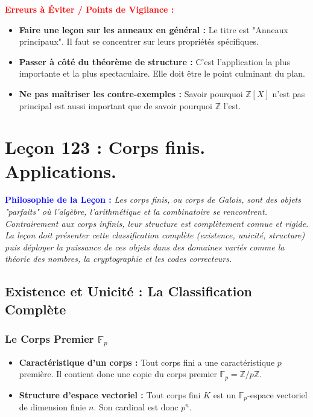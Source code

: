 \documentclass[12pt, a4paper, parskip=full]{report}
\theoremstyle{agregstyle}
\newenvironment{philosophie}
  {\par\medskip\noindent\begin{oframed}\noindent\textbf{\textcolor{blue}{Philosophie de la Leçon :}}\itshape}
  {\end{oframed}\par\medskip}
\newenvironment{erreurs}
  {\par\medskip\noindent\begin{oframed}\noindent\textbf{\textcolor{red}{Erreurs à Éviter / Points de Vigilance :}}}
  {\end{oframed}\par\medskip}
\begin{document}
\begin{erreurs}
    \begin{itemize}
        \item \textbf{Faire une leçon sur les anneaux en général :} Le titre est "Anneaux principaux". Il faut se concentrer sur leurs propriétés spécifiques.
        \item \textbf{Passer à côté du théorème de structure :} C'est l'application la plus importante et la plus spectaculaire. Elle doit être le point culminant du plan.
        \item \textbf{Ne pas maîtriser les contre-exemples :} Savoir pourquoi $\mathbb{Z}[X]$ n'est pas principal est aussi important que de savoir pourquoi $\mathbb{Z}$ l'est.
    \end{itemize}
\end{erreurs}

\newpage
\chapter{Leçon 123 : Corps finis. Applications.}

\begin{philosophie}
    Les corps finis, ou corps de Galois, sont des objets "parfaits" où l'algèbre, l'arithmétique et la combinatoire se rencontrent. Contrairement aux corps infinis, leur structure est complètement connue et rigide. La leçon doit présenter cette classification complète (existence, unicité, structure) puis déployer la puissance de ces objets dans des domaines variés comme la théorie des nombres, la cryptographie et les codes correcteurs.
\end{philosophie}

\section{Existence et Unicité : La Classification Complète}
\subsection{Le Corps Premier $\mathbb{F}_p$}
\begin{itemize}
    \item \textbf{Caractéristique d'un corps :} Tout corps fini a une caractéristique $p$ première. Il contient donc une copie du corps premier $\mathbb{F}_p = \mathbb{Z}/p\mathbb{Z}$.
    \item \textbf{Structure d'espace vectoriel :} Tout corps fini $K$ est un $\mathbb{F}_p$-espace vectoriel de dimension finie $n$. Son cardinal est donc $p^n$.
\end{itemize}
\end{document}
